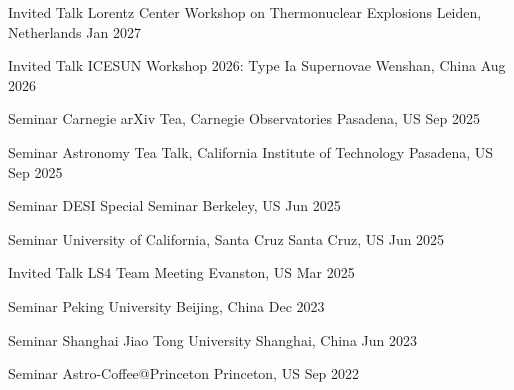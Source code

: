 


\begin{cventries}
	
	\cvsimsimpentry
	{Invited Talk}
	{Lorentz Center Workshop on Thermonuclear Explosions}
	{Leiden, Netherlands}
	{Jan 2027}

	\cvsimsimpentry
	{Invited Talk}
	{ICESUN Workshop 2026: Type Ia Supernovae}
	{Wenshan, China}
	{Aug 2026}

	\cvsimsimpentry
	{Seminar}
	{Carnegie arXiv Tea, Carnegie Observatories}
	{Pasadena, US}
	{Sep 2025}

	\cvsimsimpentry
	{Seminar}
	{Astronomy Tea Talk, California Institute of Technology}
	{Pasadena, US}
	{Sep 2025}

	\cvsimsimpentry
	{Seminar}
	{DESI Special Seminar}
	{Berkeley, US}
	{Jun 2025}

	\cvsimsimpentry
	{Seminar}
	{University of California, Santa Cruz}
	{Santa Cruz, US}
	{Jun 2025}

	\cvsimsimpentry
	{Invited Talk}
	{LS4 Team Meeting}
	{Evanston, US}
	{Mar 2025}

	\cvsimsimpentry
	{Seminar}
	{Peking University}
	{Beijing, China}
	{Dec 2023}

	\cvsimsimpentry
	{Seminar}
	{Shanghai Jiao Tong University}
	{Shanghai, China}
	{Jun 2023}

	\cvsimsimpentry
	{Seminar} %
	{Astro-Coffee@Princeton} %
	{Princeton, US} %
	{Sep 2022} %

\end{cventries}




